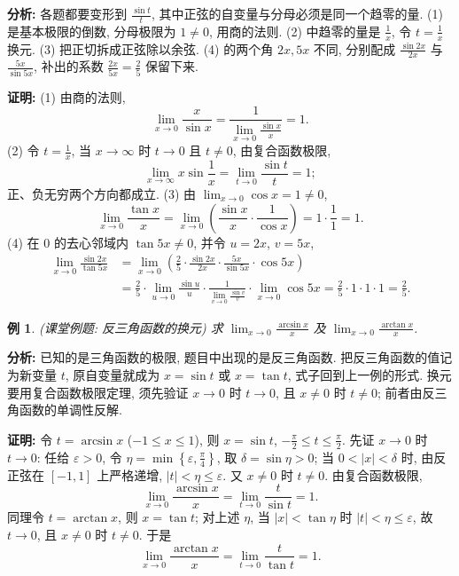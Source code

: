 \documentclass[UTF8,openany]{ctexbook}
\theoremstyle{chinesetextbook}
\newtheorem{example}{例}[section]
\newenvironment{cnproof}{\par\indent\textbf{证明:} \ignorespaces}{\par}
\begin{document}
\par\indent\textbf{分析:} 各题都要变形到 $\displaystyle\frac{\sin t}t$, 其中正弦的自变量与分母必须是同一个趋零的量. (1) 是基本极限的倒数, 分母极限为 $1\ne0$, 用商的法则. (2) 中趋零的量是 $\displaystyle\frac1x$, 令 $\displaystyle t=\frac1x$ 换元. (3) 把正切拆成正弦除以余弦. (4) 的两个角 $2x,5x$ 不同, 分别配成 $\displaystyle\frac{\sin2x}{2x}$ 与 $\displaystyle\frac{5x}{\sin5x}$, 补出的系数 $\displaystyle\frac{2x}{5x}=\frac25$ 保留下来.
\begin{cnproof}
(1) 由商的法则,
\[
\lim_{x\to0}\frac{x}{\sin x}=\frac1{\displaystyle\lim_{x\to0}\frac{\sin x}x}=1.
\]
(2) 令 $\displaystyle t=\frac1x$, 当 $x\to\infty$ 时 $t\to0$ 且 $t\ne0$, 由复合函数极限,
\[
\lim_{x\to\infty}x\sin\frac1x=\lim_{t\to0}\frac{\sin t}t=1;
\]
正、负无穷两个方向都成立.
(3) 由 $\displaystyle\lim_{x\to0}\cos x=1\ne0$,
\[
\lim_{x\to0}\frac{\tan x}x=\lim_{x\to0}\left(\frac{\sin x}x\cdot\frac1{\cos x}\right)=1\cdot\frac11=1.
\]
(4) 在 $0$ 的去心邻域内 $\tan5x\ne0$, 并令 $u=2x$, $v=5x$,
\[
\begin{aligned}
\lim_{x\to0}\frac{\sin2x}{\tan5x}
&=\lim_{x\to0}\left(\frac25\cdot\frac{\sin2x}{2x}\cdot\frac{5x}{\sin5x}\cdot\cos5x\right)\\
&=\frac25\cdot\lim_{u\to0}\frac{\sin u}u\cdot\frac1{\displaystyle\lim_{v\to0}\frac{\sin v}v}\cdot\lim_{x\to0}\cos5x
=\frac25\cdot1\cdot1\cdot1=\frac25.
\end{aligned}
\]
\end{cnproof}
\begin{example}
\textnormal{(课堂例题: 反三角函数的换元)} 求 $\displaystyle\lim_{x\to0}\frac{\arcsin x}{x}$ 及 $\displaystyle\lim_{x\to0}\frac{\arctan x}{x}$.
\end{example}
\par\indent\textbf{分析:} 已知的是三角函数的极限, 题目中出现的是反三角函数. 把反三角函数的值记为新变量 $t$, 原自变量就成为 $x=\sin t$ 或 $x=\tan t$, 式子回到上一例的形式. 换元要用复合函数极限定理, 须先验证 $x\to0$ 时 $t\to0$, 且 $x\ne0$ 时 $t\ne0$; 前者由反三角函数的单调性反解.
\begin{cnproof}
令 $t=\arcsin x$ ($-1\le x\le1$), 则 $x=\sin t$, $\displaystyle-\frac\pi2\le t\le\frac\pi2$. 先证 $x\to0$ 时 $t\to0$: 任给 $\varepsilon>0$, 令 $\displaystyle\eta=\min\left\{\varepsilon,\frac\pi4\right\}$, 取 $\delta=\sin\eta>0$; 当 $0<|x|<\delta$ 时, 由反正弦在 $[-1,1]$ 上严格递增, $|t|<\eta\le\varepsilon$. 又 $x\ne0$ 时 $t\ne0$. 由复合函数极限,
\[
\lim_{x\to0}\frac{\arcsin x}x=\lim_{t\to0}\frac t{\sin t}=1.
\]
同理令 $t=\arctan x$, 则 $x=\tan t$; 对上述 $\eta$, 当 $|x|<\tan\eta$ 时 $|t|<\eta\le\varepsilon$, 故 $t\to0$, 且 $x\ne0$ 时 $t\ne0$. 于是
\[
\lim_{x\to0}\frac{\arctan x}x=\lim_{t\to0}\frac t{\tan t}=1.
\]
\end{cnproof}
\end{document}
